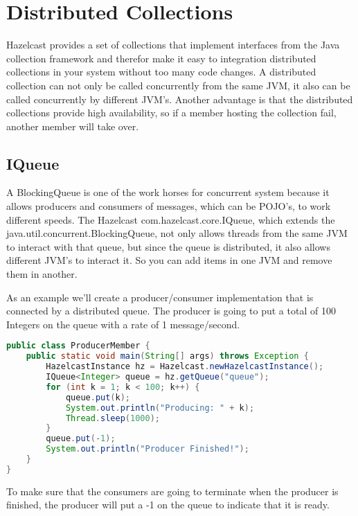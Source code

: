 \chapter{Distributed Collections}
Hazelcast provides a set of collections that implement interfaces from the Java collection framework and therefor make it easy to integration distributed collections in your system without too many code changes. A distributed collection can not only be called concurrently from the same JVM, it also can be called concurrently by different JVM's. Another advantage is that the distributed collections provide high availability, so if a member hosting the collection fail, another member will take over.

\section{IQueue}
A BlockingQueue is one of the work horses for concurrent system because it allows producers and consumers of messages, which can be POJO's, to work different speeds. The Hazelcast com.hazelcast.core.IQueue, which extends the java.util.concurrent.BlockingQueue, not only allows threads from the same JVM to interact with that queue, but since the queue is distributed, it also allows different JVM's to interact it. So you can add items in one JVM and remove them in another.

As an example we'll create a producer/consumer implementation that is connected by a distributed queue. The producer is going to put a total of 100 Integers on the queue with a rate of 1 message/second.
\begin{lstlisting}[language=java]
public class ProducerMember {
    public static void main(String[] args) throws Exception {
        HazelcastInstance hz = Hazelcast.newHazelcastInstance();
        IQueue<Integer> queue = hz.getQueue("queue");
        for (int k = 1; k < 100; k++) {
            queue.put(k);
            System.out.println("Producing: " + k);
            Thread.sleep(1000);
        }
        queue.put(-1);
        System.out.println("Producer Finished!");
    }
}
\end{lstlisting}
To make sure that the consumers are going to terminate when the producer is finished, the producer will put a -1 on the queue to indicate that it is ready. 

